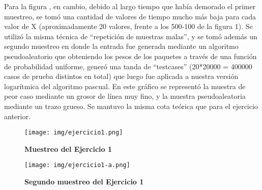 \documentclass[11pt, a4paper, twoside]{article}
\begin{document}
Para la figura , en cambio, debido al largo tiempo que había demorado el primer muestreo, 
se tomó una cantidad de valores de tiempo mucho más baja para cada valor de X (aproximadamente 20 valores, 
frente a los 500-100 de la figura 1). Se utilizó la misma técnica de \enquote{repetición de muestras malas}, y
se tomó además un segundo muestreo en donde la entrada fue generada mediante un algoritmo pseudoaleatorio
que obteniendo los pesos de los paquetes a través de una función de probabilidad uniforme, generó una 
tanda de \enquote{testcases} (20*20000 = 400000 casos de prueba distintos en total) que luego fue aplicada
a nuestra versión logarítmica del algoritmo pascual. En este gráfico se representó la muestra de peor 
caso mediante un grosor de línea muy fino, y la muestra pseudoaleatoria mediante un trazo grueso. Se 
mantuvo la misma cota teórica que para el ejercicio anterior.

\clearpage
\begin{figure}[H]
   \begin{center}
   \texttt{[image: img/ejercicio1.png]}
   \caption{\textbf{Muestreo del Ejercicio 1}}
   \label{fig:ej1}
   \end{center}
\end{figure}

\clearpage
\begin{figure}[H]
   \begin{center}
   \texttt{[image: img/ejercicio1-a.png]}
   \caption{\textbf{Segundo muestreo del Ejercicio 1}}
   \label{fig:ej1-a}
   \end{center}
\end{figure}

\end{document}
